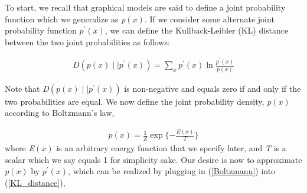 \documentclass{article}
\begin{document}
To start, we recall that graphical models are said to define a joint probability function which we generalize as \textit{p}$\left(\textit{x}\right)$. If we consider some alternate joint probability function $\textit{p}^\prime\left(\textit{x}\right)$, we can define the Kullback-Leibler (KL) distance between the two joint probabilities as follows:

\begin{equation} \label{KL_distance}
    \begin{aligned}
        \textit{D}\left(\textit{p}\left(\textit{x}\right)\mid\mid\textit{p}^{\prime}\left(\textit{x}\right) \right) = \sum_\textit{x}\textit{p}^{\prime}\left(\textit{x}\right)\ln\frac{\textit{p}^{\prime}\left(\textit{x}\right)}{\textit{p}\left(\textit{x}\right)}
    \end{aligned}
\end{equation}

Note that \textit{D}$\left(\textit{p}\left(\textit{x}\right)\mid\mid\textit{p}^{\prime}\left(\textit{x}\right) \right)$ is non-negative and equals zero if and only if the two probabilities are equal. We now define the joint probability density, \textit{p}$\left(\textit{x}\right)$ according to Boltzmann's law, 

\begin{equation} \label{Boltzmann}
    \begin{aligned}
        \textit{p}\left(\textit{x}\right) = \frac{1}{\textit{Z}}\exp\{-\frac{\textit{E}\left(\textit{x}\right)}{\textit{T}}\} 
    \end{aligned}
\end{equation} where \textit{E}$\left(\textit{x}\right)$ is an arbitrary energy function that we specify later, and \textit{T} is a scalar which we say equals 1 for simplicity sake. Our desire is now to approximate \textit{p}$\left(\textit{x}\right)$ by $\textit{p}^\prime\left(\textit{x}\right)$, which can be realized by plugging in (\ref{Boltzmann}) into (\ref{KL_distance}), 
\end{document}
